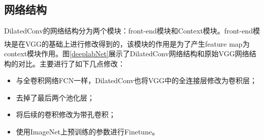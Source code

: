 \documentclass[cn]{elegantbook}
\newcommand{\upcite}[1]{\textsuperscript{\textsuperscript{\cite{#1}}}}
\begin{document}
\subsection{网络结构}

DilatedConv的网络结构分为两个模块：front-end模块和Context模块。front-end模块是在VGG\upcite{simonyan2014very}的基础上进行修改得到的，该模块的作用是为了产生feature map为context模块作用。图\ref{deeplabNet}展示了DilatedConv网络结构和原始VGG网络结构的对比。主要进行了如下几点修改：
\begin{itemize}
	\item 与全卷积网络FCN一样，DilatedConv也将VGG中的全连接层修改为卷积层；
	\item 去掉了最后两个池化层；
	\item 将后续的卷积修改为带孔卷积；
	\item 使用ImageNet上预训练的参数进行Finetune。
\end{itemize}
\end{document}
